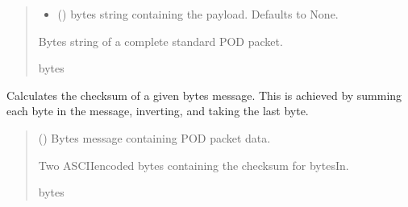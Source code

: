 \documentclass[letterpaper,10pt,english]{sphinxmanual}
\begin{document}
\begin{fulllineitems}
\begin{fulllineitems}
\begin{quote}
\begin{description}
\begin{itemize}
\item {} 
\sphinxAtStartPar
{} (\sphinxstyleliteralemphasis{\sphinxupquote{ | }}\sphinxstyleliteralemphasis{\sphinxupquote{, }}) \textendash{} bytes string containing the payload. Defaults to None.

\end{itemize}

\sphinxAtStartPar
Bytes string of a complete standard POD packet.

\sphinxAtStartPar
bytes

\end{description}\end{quote}

\end{fulllineitems}


\begin{fulllineitems}
\label{\detokenize{Morelia.Devices:Morelia.Devices.BasicPodProtocol.Pod.Checksum}}
\pysigstartsignatures
{}
\pysigstopsignatures
\sphinxAtStartPar
Calculates the checksum of a given bytes message. This is achieved by summing each byte in the         message, inverting, and taking the last byte.
\begin{quote}\begin{description}
\sphinxAtStartPar
{} () \textendash{} Bytes message containing POD packet data.

\sphinxAtStartPar
Two ASCII\sphinxhyphen{}encoded bytes containing the checksum for bytesIn.

\sphinxAtStartPar
bytes

\end{description}\end{quote}


\end{fulllineitems}
\end{fulllineitems}
\end{document}
